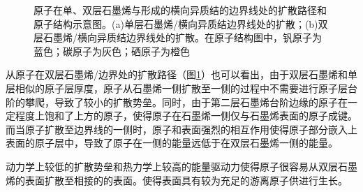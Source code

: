     \begin{figure}[!b]
    \end{figure}
    \begin{figure}\ContinuedFloat
        \caption{原子在单、双层石墨烯与形成的横向异质结的边界线处的扩散路径和原子结构示意图。(a)单层石墨烯/横向异质结边界线处的扩散；(b)双层石墨烯/横向异质结边界线处的扩散。在原子结构图中，钒原子为蓝色；碳原子为灰色；硒原子为橙色}
        \label{fig:VS_structure_VNeb}
    \end{figure}

    从原子在双层石墨烯/边界处的扩散路径（图\ref{fig:VS_structure_VNeb}）也可以看出，由于双层石墨烯和单层相似的原子层厚度，原子从石墨烯一侧扩散至一侧的过程中不需要进行原子层台阶的攀爬，导致了较小的扩散势垒。同时，由于第二层石墨烯台阶边缘的原子在一定程度上饱和了上方的原子，使得原子在石墨烯一侧仅与石墨烯表面的原子成键。而当原子扩散至边界线的一侧时，原子和表面强烈的相互作用使得原子部分嵌入上表面的原子层中，导致了原子在一侧的能量远低于在双层石墨烯一侧的能量。


    动力学上较低的扩散势垒和热力学上较高的能量驱动力使得原子很容易从双层石墨烯的表面扩散至相接的的表面。使得表面具有较为充足的游离原子供进行生长。

